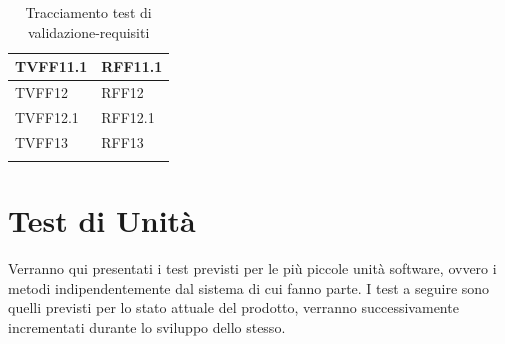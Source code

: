 \documentclass[openany,12pt,a4paper]{report}
\begin{document}
\begin{longtable}{| p{4cm} |p{4cm}|}
	TVFF11.1&RFF11.1
	\\[1em]
	\hline
	
    TVFF12&RFF12
	\\[1em]
	\hline
	
    TVFF12.1&RFF12.1
	\\[1em]
	\hline
	 TVFF13&RFF13
	\\[1em]
	\hline
\caption{Tracciamento test di validazione-requisiti}
\end{longtable}

\section{Test di Unità}

Verranno qui presentati i test previsti per le più piccole unità software, ovvero i metodi indipendentemente dal sistema di cui fanno parte. I test a seguire sono quelli previsti per lo stato attuale del prodotto, verranno successivamente incrementati durante lo sviluppo dello stesso.
\end{document}
